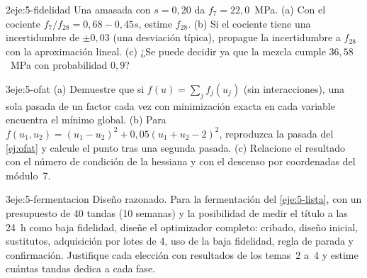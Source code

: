\begin{ejercicio}{2}{eje:5-fidelidad}
Una amasada con $s=0{,}20$ da $f_7=22{,}0$~MPa. (a) Con el cociente $f_7/f_{28}=0{,}68-0{,}45s$, estime $f_{28}$. (b) Si el cociente tiene una incertidumbre de $\pm0{,}03$ (una desviación típica), propague la incertidumbre a $f_{28}$ con la aproximación lineal. (c) ¿Se puede decidir ya que la mezcla cumple $36{,}58$~MPa con probabilidad $0{,}9$?
\end{ejercicio}

\begin{ejercicio}{3}{eje:5-ofat}
(a) Demuestre que si $f(u)=\sum_jf_j(u_j)$ (sin interacciones), una sola pasada de un factor cada vez con minimización exacta en cada variable encuentra el mínimo global. (b) Para $f(u_1,u_2)=(u_1-u_2)^2+0{,}05(u_1+u_2-2)^2$, reproduzca la pasada del \cref{ej:ofat} y calcule el punto tras una segunda pasada. (c) Relacione el resultado con el número de condición de la hessiana y con el descenso por coordenadas del módulo~7.
\end{ejercicio}

\begin{ejercicio}{3}{eje:5-fermentacion}
Diseño razonado. Para la fermentación del \cref{eje:5-lista}, con un presupuesto de 40 tandas (10 semanas) y la posibilidad de medir el título a las 24~h como baja fidelidad, diseñe el optimizador completo: cribado, diseño inicial, sustitutos, adquisición por lotes de 4, uso de la baja fidelidad, regla de parada y confirmación. Justifique cada elección con resultados de los temas~2 a~4 y estime cuántas tandas dedica a cada fase.
\end{ejercicio}
